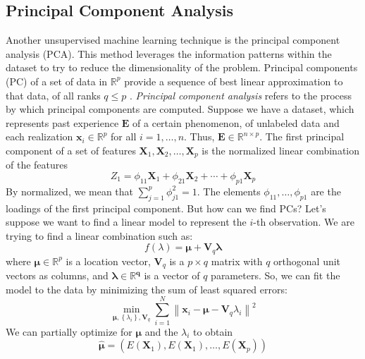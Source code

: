 \subsection{Principal Component Analysis}
\label{subsec:PCA}
Another unsupervised machine learning technique is the principal component analysis (PCA). This method leverages the information patterns within the dataset to try to reduce the dimensionality of the problem. Principal components (PC) of a set of data in $\mathbb{R}^p$ provide a sequence of best linear approximation to that data, of all ranks $q\le p$ \cite{james_introduction_2021, tibshirani_elements_2008}. \emph{Principal component analysis} refers to the process by which principal components are computed. Suppose we have a dataset, which represents past experience $\mathbf{E}$ of a certain phenomenon, of unlabeled data and each realization $\mathbf{x}_i \in \mathbb{R}^p$ for all $i=1,\dots,n$. Thus, $\mathbf{E} \in \mathbb{R}^{n\times p}$. The first principal component of a set of features $\mathbf{X}_1, \mathbf{X}_2, \dots, \mathbf{X}_p$ is the normalized linear combination of the features
\begin{equation}
    \label{eq:firstPC}
    Z_1=\phi_{11} \mathbf{X}_1+\phi_{21} \mathbf{X}_2+\cdots+\phi_{p1} \mathbf{X}_p
\end{equation}
By normalized, we mean that $\sum_{j=1}^p\phi_{j1}^2=1$. The elements $\phi_{11},\dots,\phi_{p1}$ are the loadings of the first principal component. But how can we find PCs? Let's suppose we want to find a linear model to represent the $i$-th observation. We are trying to find a linear combination such as:
\begin{equation}
    \label{eq:pcaf}
    f(\lambda)=\bm{\mu}+\mathbf{V}_q\bm{\lambda}
\end{equation}
where $\bm{\mu}\in \mathbb{R}^p$ is a location vector, $\mathbf{V}_q$ is a $p\times q$ matrix with $q$ orthogonal unit vectors as columns, and $\bm{\lambda \in \mathbb{R}^q}$ is a vector of $q$ parameters. So, we can fit the model to the data by minimizing the sum of least squared errors:
\begin{equation}
    \label{eq:SSE}
    \min _{\bm{\mu},\left\{\lambda_i\right\}, \mathbf{V}_q} \sum_{i=1}^N\left\|\mathbf{x}_i-\bm{\mu}-\mathbf{V}_q \lambda_i\right\|^2
\end{equation}
We can partially optimize for $\bm{\mu}$ and the $\lambda_i$ to obtain
\begin{equation}
    \hat{\bm{\mu}} = \left(E\left(\mathbf{X}_1\right), E\left(\mathbf{X}_1\right), \dots, E\left(\mathbf{X}_p\right)\right)
\end{equation}
